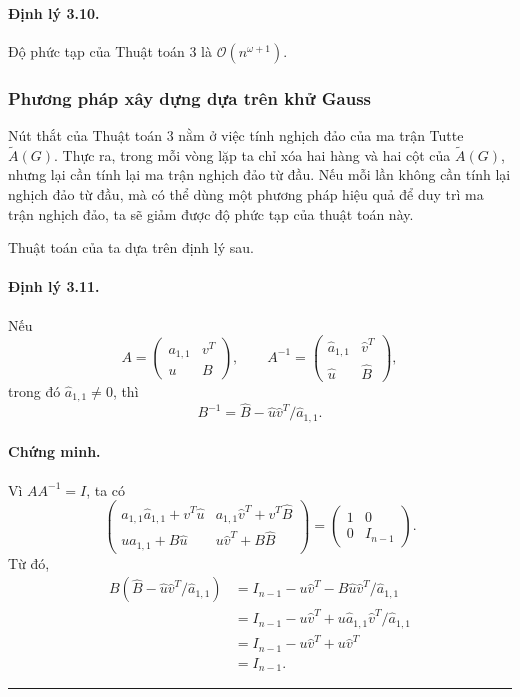 \documentclass[11pt]{article}
\newcommand{\Oh}{\mathcal{O}}
\newcommand{\qedmark}{\hfill\rule{0.7ex}{0.7ex}}
\begin{document}
\paragraph{Định lý 3.10.}
Độ phức tạp của Thuật toán 3 là \(\Oh(n^{\omega+1})\).

\subsubsection{Phương pháp xây dựng dựa trên khử Gauss}

Nút thắt của Thuật toán 3 nằm ở việc tính nghịch đảo của ma trận Tutte
\(\tilde A(G)\). Thực ra, trong mỗi vòng lặp ta chỉ xóa hai hàng và hai cột
của \(\tilde A(G)\), nhưng lại cần tính lại ma trận nghịch đảo từ đầu. Nếu mỗi
lần không cần tính lại nghịch đảo từ đầu, mà có thể dùng một phương pháp hiệu
quả để duy trì ma trận nghịch đảo, ta sẽ giảm được độ phức tạp của thuật toán
này.

Thuật toán của ta dựa trên định lý sau.

\paragraph{Định lý 3.11.}
Nếu
\[
  A=
  \begin{pmatrix}
    a_{1,1} & v^T\\
    u & B
  \end{pmatrix},
  \qquad
  A^{-1}=
  \begin{pmatrix}
    \hat a_{1,1} & \hat v^T\\
    \hat u & \hat B
  \end{pmatrix},
\]
trong đó \(\hat a_{1,1}\ne 0\), thì
\[
  B^{-1}=\hat B-\hat u\hat v^T/\hat a_{1,1}.
\]

\paragraph{Chứng minh.}
Vì \(AA^{-1}=I\), ta có
\[
  \begin{pmatrix}
    a_{1,1}\hat a_{1,1}+v^T\hat u &
    a_{1,1}\hat v^T+v^T\hat B\\
    u\hat a_{1,1}+B\hat u &
    u\hat v^T+B\hat B
  \end{pmatrix}
  =
  \begin{pmatrix}
    1 & 0\\
    0 & I_{n-1}
  \end{pmatrix}.
\]
Từ đó,
\[
\begin{aligned}
  B(\hat B-\hat u\hat v^T/\hat a_{1,1})
  &= I_{n-1}-u\hat v^T-B\hat u\hat v^T/\hat a_{1,1}\\
  &= I_{n-1}-u\hat v^T+u\hat a_{1,1}\hat v^T/\hat a_{1,1}\\
  &= I_{n-1}-u\hat v^T+u\hat v^T\\
  &= I_{n-1}.
\end{aligned}
\]
\qedmark
\end{document}
